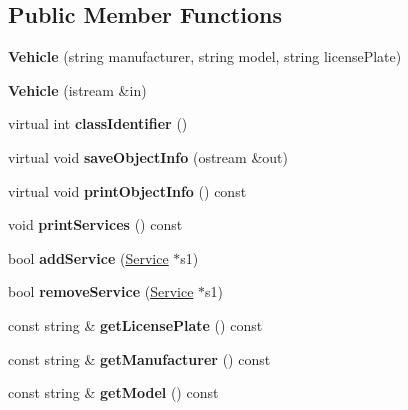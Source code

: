 \subsection*{Public Member Functions}
\begin{DoxyCompactItemize}
\item 
\hypertarget{class_vehicle_a893b8305e67b405820374681ca24adb8}{}{\bfseries Vehicle} (string manufacturer, string model, string license\+Plate)\label{class_vehicle_a893b8305e67b405820374681ca24adb8}

\item 
\hypertarget{class_vehicle_a9c1e962253f1caf699b72e9081d8c02c}{}{\bfseries Vehicle} (istream \&in)\label{class_vehicle_a9c1e962253f1caf699b72e9081d8c02c}

\item 
\hypertarget{class_vehicle_a156149accbe781d1533ac3326f8b8c36}{}virtual int {\bfseries class\+Identifier} ()\label{class_vehicle_a156149accbe781d1533ac3326f8b8c36}

\item 
\hypertarget{class_vehicle_abe2134da6c7c2dac66634f8bab33d4e0}{}virtual void {\bfseries save\+Object\+Info} (ostream \&out)\label{class_vehicle_abe2134da6c7c2dac66634f8bab33d4e0}

\item 
\hypertarget{class_vehicle_aa0dcd60b0862190b33e03e356e5ac605}{}virtual void {\bfseries print\+Object\+Info} () const \label{class_vehicle_aa0dcd60b0862190b33e03e356e5ac605}

\item 
\hypertarget{class_vehicle_aa8b234215cdebfbcfc0638070cc0055d}{}void {\bfseries print\+Services} () const \label{class_vehicle_aa8b234215cdebfbcfc0638070cc0055d}

\item 
\hypertarget{class_vehicle_a80cf791ce88075cab396cf074636f7c2}{}bool {\bfseries add\+Service} (\hyperlink{class_service}{Service} $\ast$s1)\label{class_vehicle_a80cf791ce88075cab396cf074636f7c2}

\item 
\hypertarget{class_vehicle_aedab174d431748f24e703e151c4208f8}{}bool {\bfseries remove\+Service} (\hyperlink{class_service}{Service} $\ast$s1)\label{class_vehicle_aedab174d431748f24e703e151c4208f8}

\item 
\hypertarget{class_vehicle_a425dc48d7b612ebefe2d62d6ff0a13f8}{}const string \& {\bfseries get\+License\+Plate} () const \label{class_vehicle_a425dc48d7b612ebefe2d62d6ff0a13f8}

\item 
\hypertarget{class_vehicle_a09ebc4c11e1004681ec4d78c93e9013c}{}const string \& {\bfseries get\+Manufacturer} () const \label{class_vehicle_a09ebc4c11e1004681ec4d78c93e9013c}

\item 
\hypertarget{class_vehicle_a5169e58c8510a256438a1b7532aa422f}{}const string \& {\bfseries get\+Model} () const \label{class_vehicle_a5169e58c8510a256438a1b7532aa422f}

\end{DoxyCompactItemize}


